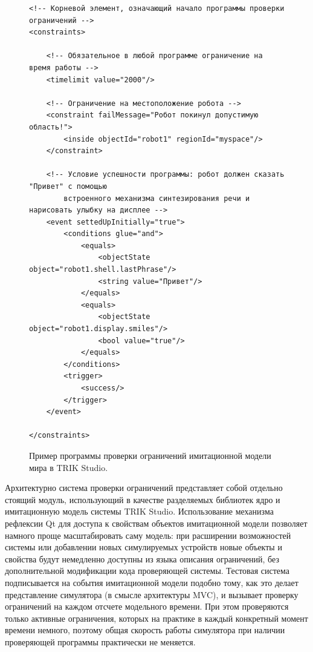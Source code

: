 \documentclass[conference]{IEEEtran}
\begin{document}
\begin{figure}[!t]
\begin{verbatim}
<!-- Корневой элемент, означающий начало программы проверки ограничений -->
<constraints>

    <!-- Обязательное в любой программе ограничение на время работы -->
    <timelimit value="2000"/>

    <!-- Ограничение на местоположение робота -->
    <constraint failMessage="Робот покинул допустимую область!">
        <inside objectId="robot1" regionId="myspace"/>
    </constraint>

    <!-- Условие успешности программы: робот должен сказать "Привет" с помощью
        встроенного механизма синтезирования речи и нарисовать улыбку на дисплее -->
    <event settedUpInitially="true">
        <conditions glue="and">
            <equals>
                <objectState object="robot1.shell.lastPhrase"/>
                <string value="Привет"/>
            </equals>
            <equals>
                <objectState object="robot1.display.smiles"/>
                <bool value="true"/>
            </equals>
        </conditions>
        <trigger>
            <success/>
        </trigger>
    </event>

</constraints>
\end{verbatim}
\caption{Пример программы проверки ограничений имитационной модели мира в TRIK Studio.}
\label{code:constraints}
\end{figure}

Архитектурно система проверки ограничений представляет собой отдельно стоящий модуль, использующий в качестве разделяемых библиотек ядро и имитационную модель системы TRIK Studio. Использование механизма рефлексии Qt для доступа к свойствам объектов имитационной модели позволяет намного проще масштабировать саму модель: при расширении возможностей системы или добавлении новых симулируемых устройств новые объекты и свойства будут немедленно доступны из языка описания ограничений, без дополнительной модификации кода проверяющей системы. Тестовая система подписывается на события имитационной модели подобно тому, как это делает представление симулятора (в смысле архитектуры MVC), и вызывает проверку ограничений на каждом отсчете модельного времени. При этом проверяются только активные ограничения, которых на практике в каждый конкретный момент времени немного, поэтому общая скорость работы симулятора при наличии проверяющей программы практически не меняется.
\end{document}
